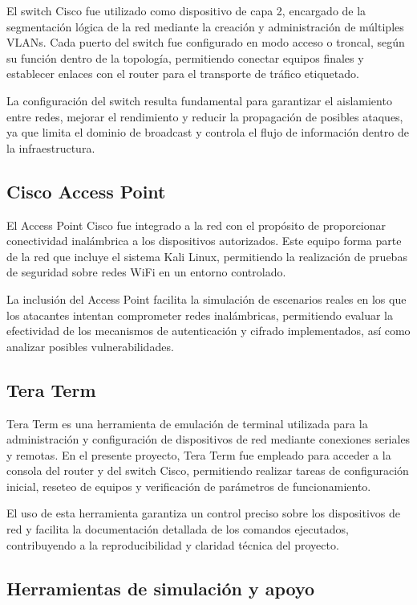 El switch Cisco fue utilizado como dispositivo de capa 2, encargado de la segmentación lógica de la red mediante la creación y administración de múltiples VLANs. Cada puerto del switch fue configurado en modo acceso o troncal, según su función dentro de la topología, permitiendo conectar equipos finales y establecer enlaces con el router para el transporte de tráfico etiquetado.

La configuración del switch resulta fundamental para garantizar el aislamiento entre redes, mejorar el rendimiento y reducir la propagación de posibles ataques, ya que limita el dominio de broadcast y controla el flujo de información dentro de la infraestructura.

\subsection{Cisco Access Point}

El Access Point Cisco fue integrado a la red con el propósito de proporcionar conectividad inalámbrica a los dispositivos autorizados. Este equipo forma parte de la red que incluye el sistema Kali Linux, permitiendo la realización de pruebas de seguridad sobre redes WiFi en un entorno controlado.

La inclusión del Access Point facilita la simulación de escenarios reales en los que los atacantes intentan comprometer redes inalámbricas, permitiendo evaluar la efectividad de los mecanismos de autenticación y cifrado implementados, así como analizar posibles vulnerabilidades.

\subsection{Tera Term}

Tera Term es una herramienta de emulación de terminal utilizada para la administración y configuración de dispositivos de red mediante conexiones seriales y remotas. En el presente proyecto, Tera Term fue empleado para acceder a la consola del router y del switch Cisco, permitiendo realizar tareas de configuración inicial, reseteo de equipos y verificación de parámetros de funcionamiento.

El uso de esta herramienta garantiza un control preciso sobre los dispositivos de red y facilita la documentación detallada de los comandos ejecutados, contribuyendo a la reproducibilidad y claridad técnica del proyecto.

\subsection{Herramientas de simulación y apoyo}


